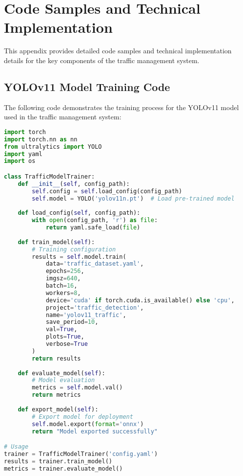 \chapter{Code Samples and Technical Implementation}
\label{app:code_samples}

This appendix provides detailed code samples and technical implementation details for the key components of the traffic management system.

\section{YOLOv11 Model Training Code}
\label{app:yolo_training}

The following code demonstrates the training process for the YOLOv11 model used in the traffic management system:

\begin{lstlisting}[language=Python, caption=YOLOv11 Training Implementation]
import torch
import torch.nn as nn
from ultralytics import YOLO
import yaml
import os

class TrafficModelTrainer:
    def __init__(self, config_path):
        self.config = self.load_config(config_path)
        self.model = YOLO('yolov11n.pt')  # Load pre-trained model
        
    def load_config(self, config_path):
        with open(config_path, 'r') as file:
            return yaml.safe_load(file)
    
    def train_model(self):
        # Training configuration
        results = self.model.train(
            data='traffic_dataset.yaml',
            epochs=256,
            imgsz=640,
            batch=16,
            workers=8,
            device='cuda' if torch.cuda.is_available() else 'cpu',
            project='traffic_detection',
            name='yolov11_traffic',
            save_period=10,
            val=True,
            plots=True,
            verbose=True
        )
        return results
    
    def evaluate_model(self):
        # Model evaluation
        metrics = self.model.val()
        return metrics
    
    def export_model(self):
        # Export model for deployment
        self.model.export(format='onnx')
        return "Model exported successfully"

# Usage
trainer = TrafficModelTrainer('config.yaml')
results = trainer.train_model()
metrics = trainer.evaluate_model()
\end{lstlisting}

